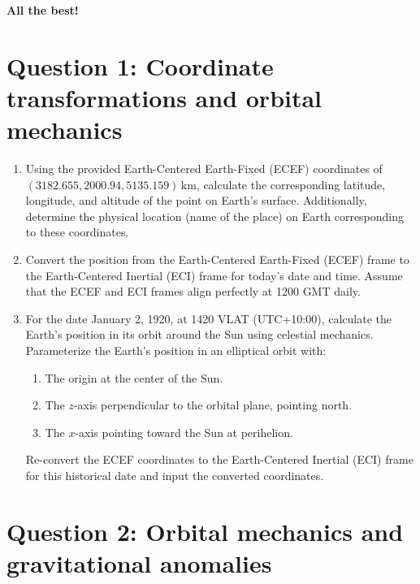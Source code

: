 \documentclass[a4paper, 12pt]{exam}
\begin{document}
	\begin{center}
		\textbf{All the best!}
	\end{center}
		
	\pagebreak
	
	

\section*{Question 1: Coordinate transformations and orbital mechanics}

\begin{enumerate}[label = (\alph*)]
	\item Using the provided Earth-Centered Earth-Fixed (ECEF) coordinates of $(3182.655, 2000.94, 5135.159) \, \text{km}$, calculate the corresponding latitude, longitude, and altitude of the point on Earth's surface. Additionally, determine the physical location (name of the place) on Earth corresponding to these coordinates.
	\item Convert the position from the Earth-Centered Earth-Fixed (ECEF) frame to the Earth-Centered Inertial (ECI) frame for today's date and time. Assume that the ECEF and ECI frames align perfectly at 1200 GMT daily.
	\item For the date January 2, 1920, at 1420 VLAT (UTC+10:00), calculate the Earth's position in its orbit around the Sun using celestial mechanics. Parameterize the Earth's position in an elliptical orbit with:
	\begin{enumerate}[label = (\roman*)]
		\item The origin at the center of the Sun.
		\item The \( z \)-axis perpendicular to the orbital plane, pointing north.
		\item The \( x \)-axis pointing toward the Sun at perihelion.
	\end{enumerate}
	Re-convert the ECEF coordinates to the Earth-Centered Inertial (ECI) frame for this historical date and input the converted coordinates.
\end{enumerate}

	\pagebreak

\section*{Question 2: Orbital mechanics and gravitational anomalies}
\end{document}
